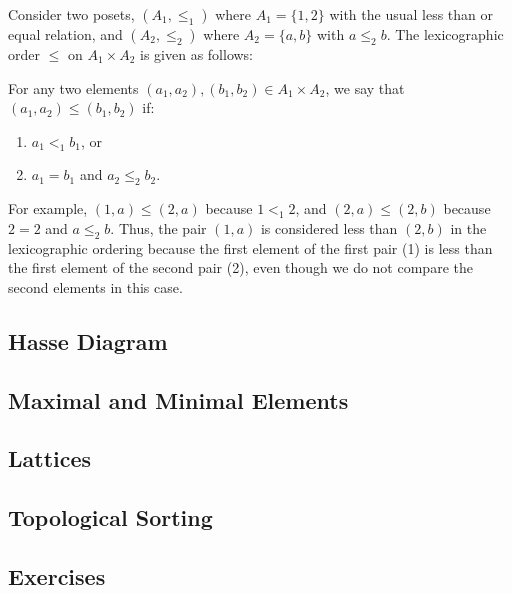 \begin{example}
	Consider two posets, \( (A_1, \leq_1) \) where \( A_1 = \{1, 2\} \) with the usual less than or equal relation, and \( (A_2, \leq_2) \) where \( A_2 = \{a, b\} \) with \( a \leq_2 b \). The lexicographic order \( \leq \) on \( A_1 \times A_2 \) is given as follows:
	
	For any two elements \( (a_1, a_2), (b_1, b_2) \in A_1 \times A_2 \), we say that \( (a_1, a_2) \leq (b_1, b_2) \) if:
	
	\begin{enumerate}
		\item \( a_1 <_1 b_1 \), or
		\item \( a_1 = b_1 \) and \( a_2 \leq_2 b_2 \).
	\end{enumerate}
	
	For example, \( (1, a) \leq (2, a) \) because \( 1 <_1 2 \), and \( (2, a) \leq (2, b) \) because \( 2 = 2 \) and \( a \leq_2 b \). Thus, the pair \( (1, a) \) is considered less than \( (2, b) \) in the lexicographic ordering because the first element of the first pair (1) is less than the first element of the second pair (2), even though we do not compare the second elements in this case.
\end{example}

\subsection{Hasse Diagram}


\subsection{Maximal and Minimal Elements}


\subsection{Lattices}

\subsection{Topological Sorting}




\subsection{Exercises}


